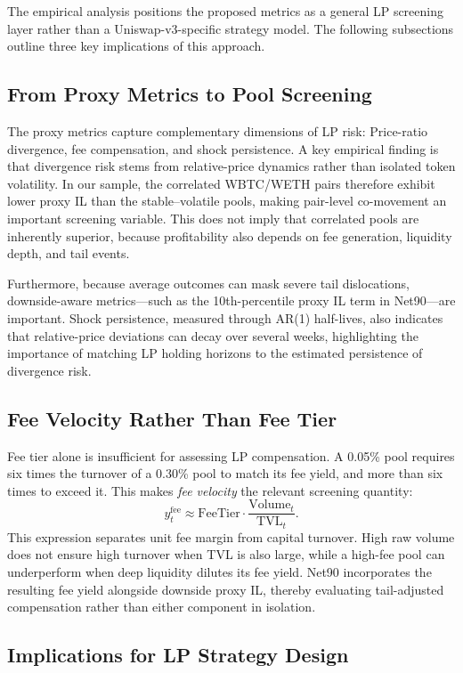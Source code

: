 \documentclass[10pt,conference,compsocconf]{IEEEtran}
\begin{document}
The empirical analysis positions the proposed metrics as a general LP screening layer rather than a Uniswap-v3-specific strategy model. The following subsections outline three key implications of this approach.

\subsection{From Proxy Metrics to Pool Screening}

The proxy metrics capture complementary dimensions of LP risk: Price-ratio divergence, fee compensation, and shock persistence. A key empirical finding is that divergence risk stems from relative-price dynamics rather than isolated token volatility. In our sample, the correlated WBTC/WETH pairs therefore exhibit lower proxy IL than the stable--volatile pools, making pair-level co-movement an important screening variable. This does not imply that correlated pools are inherently superior, because profitability also depends on fee generation, liquidity depth, and tail events.

Furthermore, because average outcomes can mask severe tail dislocations, downside-aware metrics---such as the 10th-percentile proxy IL term in Net90---are important. Shock persistence, measured through AR(1) half-lives, also indicates that relative-price deviations can decay over several weeks, highlighting the importance of matching LP holding horizons to the estimated persistence of divergence risk.

\subsection{Fee Velocity Rather Than Fee Tier}

Fee tier alone is insufficient for assessing LP compensation. A 0.05\% pool requires six times the turnover of a 0.30\% pool to match its fee yield, and more than six times to exceed it. This makes \emph{fee velocity} the relevant screening quantity:
\[
y^{\mathrm{fee}}_t
\approx
\mathrm{FeeTier}
\cdot
\frac{\mathrm{Volume}_t}{\mathrm{TVL}_t}.
\]
This expression separates unit fee margin from capital turnover. High raw volume does not ensure high turnover when TVL is also large, while a high-fee pool can underperform when deep liquidity dilutes its fee yield. Net90 incorporates the resulting fee yield alongside downside proxy IL, thereby evaluating tail-adjusted compensation rather than either component in isolation.

\subsection{Implications for LP Strategy Design}
\end{document}
